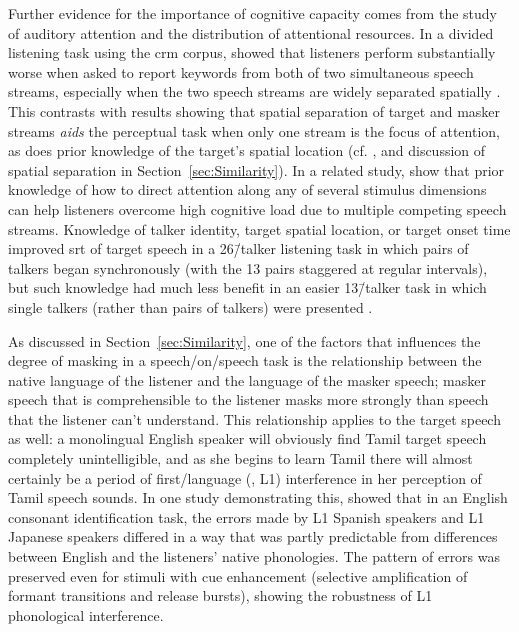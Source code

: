 Further evidence for the importance of cognitive capacity comes from the study of auditory attention and the distribution of attentional resources.  In a divided listening task using the \ac{crm} corpus, \citeauthor*{BestEtAl2006} showed that listeners perform substantially worse when asked to report keywords from both of two simultaneous speech streams, especially when the two speech streams are widely separated spatially \citep{BestEtAl2006}.  This contrasts with results showing that spatial separation of target and masker streams {\em aids} the perceptual task when only one stream is the focus of attention, as does prior knowledge of the target’s spatial location (cf. \citealt{KiddEtAl2005a}, and discussion of spatial separation in Section~\ref{sec:Similarity}).  In a related study, \citeauthor*{KitterickEtAl2010} show that prior knowledge of how to direct attention along any of several stimulus dimensions can help listeners overcome high cognitive load due to multiple competing speech streams.  Knowledge of talker identity, target spatial location, or target onset time improved \ac{srt} of target speech in a 26\=/talker listening task in which pairs of talkers began synchronously (with the 13 pairs staggered at regular intervals), but such knowledge had much less benefit in an easier 13\=/talker task in which single talkers (rather than pairs of talkers) were presented \citep{KitterickEtAl2010}.  %


As discussed in Section~\ref{sec:Similarity}, one of the factors that influences the degree of masking in a speech\-/on\-/speech task is the relationship between the native language of the listener and the language of the masker speech; masker speech that is comprehensible to the listener masks more strongly than speech that the listener can’t understand.  This relationship applies to the target speech as well: a monolingual English speaker will obviously find Tamil target speech completely unintelligible, and as she begins to learn Tamil there will almost certainly be a period of first\-/language (\aka, L1) interference in her perception of Tamil speech sounds.  In one study demonstrating this, \citet{HazanSimpson2000} showed that in an English consonant identification task, the errors made by L1 Spanish speakers and L1 Japanese speakers differed in a way that was partly predictable from differences between English and the listeners’ native phonologies.  The pattern of errors was preserved even for stimuli with cue enhancement (selective amplification of formant transitions and release bursts), showing the robustness of L1 phonological interference.

